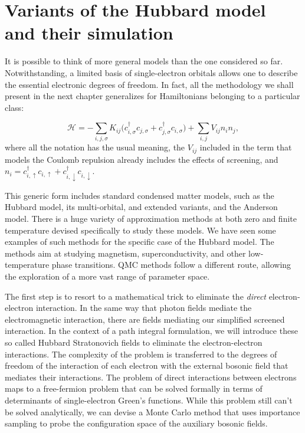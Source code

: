\section{Variants of the Hubbard model and their simulation}\label{sec:variants}

It is possible to think of more general  models than the one considered so far.
Notwithstanding, a limited basis of single-electron orbitals allows one to describe the essential electronic degrees of freedom.
In fact, all the methodology we shall present in the next chapter generalizes for Hamiltonians belonging to a particular class:

\begin{equation}\label{eq:variantsForm}
\mathcal{H} = - \sum_{i, j, \sigma} K_{ij} \bigg( c_{i, \sigma}^\dagger c_{j, \sigma} + c_{j, \sigma}^\dagger c_{i, \sigma} \bigg) + \sum_{i, j} V_{ij} n_i n_j ,
\end{equation}
where all the notation has the usual meaning, the $V_{ij}$ included in the term that models the Coulomb repulsion already includes the effects of screening, and $n_i = c_{i,\uparrow}^\dagger c_{i,\uparrow} + c_{i,\downarrow}^\dagger c_{i,\downarrow}$.

This generic form includes standard condensed matter models, such as the Hubbard model, its multi-orbital, and extended variants, and the Anderson model.
There is a huge variety of approximation methods at both zero and finite temperature devised specifically to study these models.
We have seen some examples of such methods for the specific case of the Hubbard model.
The methods aim at studying magnetism, superconductivity, and other low-temperature phase transitions.
\ac{QMC} methods follow a different route, allowing the exploration of a more vast range of parameter space.

The first step is to resort to a mathematical trick to eliminate the \emph{direct} electron-electron interaction.
In the same way that photon fields mediate the electromagnetic interaction, there are fields mediating our simplified screened interaction.
In the context of a path integral formulation, we will introduce these so called Hubbard Stratonovich fields to eliminate the electron-electron interactions.
The complexity of the problem is transferred to the degrees of freedom of the interaction of each electron with the external bosonic field that mediates their interactions.
The problem of direct interactions between electrons maps to a free-fermion problem that can be solved formally in terms of determinants of single-electron Green's functions.
While this problem still can't be solved analytically, we can devise a Monte Carlo method that uses importance sampling to probe the configuration space of the auxiliary bosonic fields.

